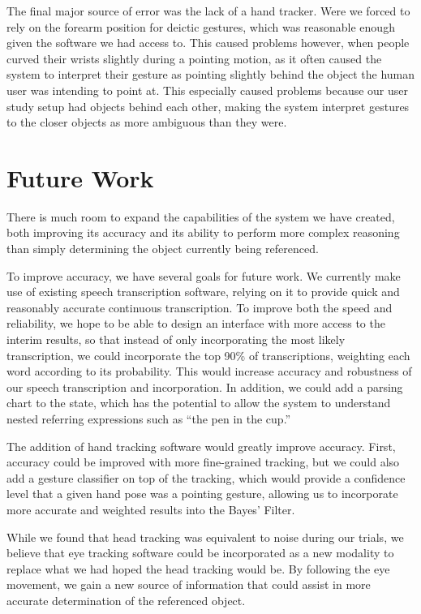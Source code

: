 \documentclass[a4paper, 11pt]{article} %
\begin{document}
The final major source of error was the lack of a hand tracker. Were we forced to rely on the forearm position for deictic gestures, which was reasonable enough given the software we had access to. This caused problems however, when people curved their wrists slightly during a pointing motion, as it often caused the system to interpret their gesture as pointing slightly behind the object the human user was intending to point at. This especially caused problems because our user study setup had objects behind each other, making the system interpret gestures to the closer objects as more ambiguous than they were.

\section{Future Work}
There is much room to expand the capabilities of the system we have created, both improving its accuracy and its ability to perform more complex reasoning than simply determining the object currently being referenced.

To improve accuracy, we have several goals for future work. We currently make use of existing speech transcription software, relying on it to provide quick and reasonably accurate continuous transcription. To improve both the speed and reliability, we hope to be able to design an interface with more access to the interim results, so that instead of only incorporating the most likely transcription, we could incorporate the top 90\% of transcriptions, weighting each word according to its probability. This would increase accuracy and robustness of our speech transcription and incorporation. In addition, we could add a parsing chart to the state, which has the potential to allow the system to understand nested referring expressions such as ``the pen in the cup.''

The addition of hand tracking software would greatly improve accuracy. First, accuracy could be improved with more fine-grained tracking, but we could also add a gesture classifier on top of the tracking, which would provide a confidence level that a given hand pose was a pointing gesture, allowing us to incorporate more accurate and weighted results into the Bayes' Filter.

While we found that head tracking was equivalent to noise during our trials, we believe that eye tracking software could be incorporated as a new modality to replace what we had hoped the head tracking would be. By following the eye movement, we gain a new source of information that could assist in more accurate determination of the referenced object.
\end{document}
